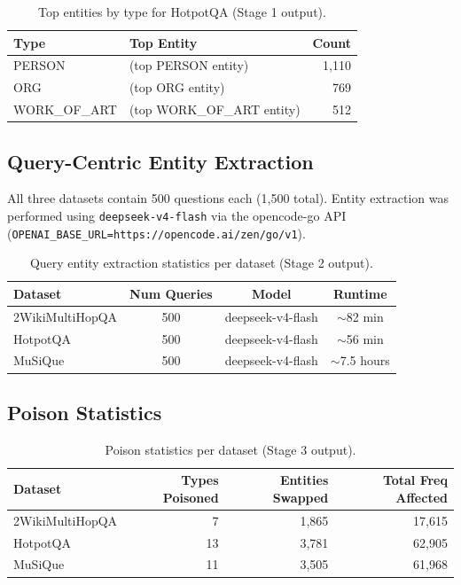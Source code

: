 \documentclass[11pt,a4paper]{article}
\begin{document}
\begin{table}[H]
\centering
\caption{Top entities by type for HotpotQA (Stage 1 output).}
\begin{tabular}{l l r}
\toprule
\textbf{Type} & \textbf{Top Entity} & \textbf{Count} \\
\midrule
PERSON       & (top PERSON entity)       & 1,110 \\
ORG          & (top ORG entity)          & 769 \\
WORK\_OF\_ART & (top WORK\_OF\_ART entity) & 512 \\
\bottomrule
\end{tabular}
\end{table}

\subsection{Query-Centric Entity Extraction}

All three datasets contain 500 questions each (1,500 total).
Entity extraction was performed using \texttt{deepseek-v4-flash} via the
opencode-go API (\texttt{OPENAI\_BASE\_URL=https://opencode.ai/zen/go/v1}).

\begin{table}[H]
\centering
\caption{Query entity extraction statistics per dataset (Stage 2 output).}
\begin{tabular}{l c c c}
\toprule
\textbf{Dataset} & \textbf{Num Queries} & \textbf{Model} & \textbf{Runtime} \\
\midrule
2WikiMultiHopQA & 500 & deepseek-v4-flash & $\sim$82 min \\
HotpotQA        & 500 & deepseek-v4-flash & $\sim$56 min \\
MuSiQue         & 500 & deepseek-v4-flash & $\sim$7.5 hours \\
\bottomrule
\end{tabular}
\end{table}

\subsection{Poison Statistics}

\begin{table}[H]
\centering
\caption{Poison statistics per dataset (Stage 3 output).}
\begin{tabular}{l r r r}
\toprule
\textbf{Dataset} & \textbf{Types Poisoned} & \textbf{Entities Swapped} & \textbf{Total Freq Affected} \\
\midrule
2WikiMultiHopQA & 7   & 1,865 & 17,615 \\
HotpotQA        & 13  & 3,781 & 62,905 \\
MuSiQue         & 11  & 3,505 & 61,968 \\
\bottomrule
\end{tabular}
\end{table}
\end{document}
